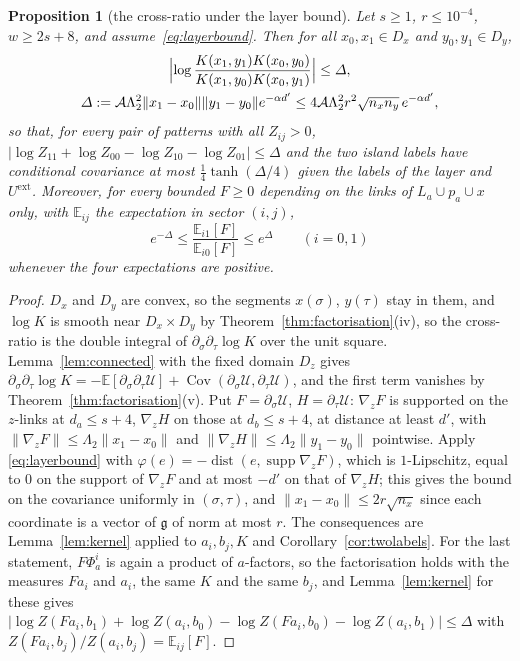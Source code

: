 \documentclass[11pt]{amsart}
\newtheorem{proposition}[theorem]{Proposition}
\theoremstyle{definition}
\theoremstyle{remark}
\numberwithin{equation}{section}
\newcommand{\E}{\mathbb{E}}
\newcommand{\g}{\mathfrak{g}}
\newcommand{\Cov}{\operatorname{Cov}}
\newcommand{\dist}{\operatorname{dist}}
\begin{document}
\begin{proposition}[the cross-ratio under the layer bound]\label{prop:layercross}
Let $s\ge1$, $r\le10^{-4}$, $w\ge2s+8$, and assume~\eqref{eq:layerbound}.
Then for all $x_0,x_1\in D_x$ and $y_0,y_1\in D_y$,
\[
\begin{gathered}
\Bigl|\log\frac{K(x_1,y_1)K(x_0,y_0)}{K(x_1,y_0)K(x_0,y_1)}\Bigr|\le
\varDelta,\\
\varDelta:=\mathcal A\Lambda_2^2\lVert x_1-x_0\rVert\lVert y_1-y_0\rVert
e^{-\alpha d'}\le4\mathcal A\Lambda_2^2r^2\sqrt{n_xn_y}\,e^{-\alpha d'},
\end{gathered}
\]
so that, for every pair of patterns with all $Z_{ij}>0$,
$\lvert\log Z_{11}+\log Z_{00}-\log Z_{10}-\log Z_{01}\rvert\le\varDelta$
and the two island labels have conditional covariance at most
$\frac14\tanh(\varDelta/4)$ given the labels of the layer and
$U^{\mathrm{ext}}$. Moreover, for every bounded $F\ge0$ depending on the
links of $L_a\cup p_a\cup x$ only, with $\E_{ij}$ the expectation in
sector $(i,j)$,
\[
e^{-\varDelta}\le\frac{\E_{i1}[F]}{\E_{i0}[F]}\le e^{\varDelta}
\qquad(i=0,1)
\]
whenever the four expectations are positive.
\end{proposition}

\begin{proof}
$D_x$ and $D_y$ are convex, so the segments $x(\sigma)$, $y(\tau)$ stay in
them, and $\log K$ is smooth near $D_x\times D_y$ by
Theorem~\ref{thm:factorisation}(iv), so the cross-ratio is the double
integral of $\partial_\sigma\partial_\tau\log K$ over the unit square.
Lemma~\ref{lem:connected} with the fixed domain $D_z$ gives
$\partial_\sigma\partial_\tau\log K=-\E[\partial_\sigma\partial_\tau
\mathcal U]+\Cov(\partial_\sigma\mathcal U,\partial_\tau\mathcal U)$, and
the first term vanishes by Theorem~\ref{thm:factorisation}(v). Put
$F=\partial_\sigma\mathcal U$, $H=\partial_\tau\mathcal U$: $\nabla_zF$ is
supported on the $z$-links at $d_a\le s+4$, $\nabla_zH$ on those at
$d_b\le s+4$, at distance at least $d'$, with
$\lVert\nabla_zF\rVert\le\Lambda_2\lVert x_1-x_0\rVert$ and
$\lVert\nabla_zH\rVert\le\Lambda_2\lVert y_1-y_0\rVert$ pointwise. Apply
\eqref{eq:layerbound} with $\varphi(e)=-\dist(e,\operatorname{supp}
\nabla_zF)$, which is $1$-Lipschitz, equal to $0$ on the support of
$\nabla_zF$ and at most $-d'$ on that of $\nabla_zH$; this gives the bound
on the covariance uniformly in $(\sigma,\tau)$, and
$\lVert x_1-x_0\rVert\le2r\sqrt{n_x}$ since each coordinate is a vector of
$\g$ of norm at most $r$. The consequences are Lemma~\ref{lem:kernel}
applied to $a_i,b_j,K$ and Corollary~\ref{cor:twolabels}. For the last
statement, $F\Phi_a^i$ is again a product of $a$-factors, so the
factorisation holds with the measures $Fa_i$ and $a_i$, the same $K$ and
the same $b_j$, and Lemma~\ref{lem:kernel} for these gives
$\lvert\log Z(Fa_i,b_1)+\log Z(a_i,b_0)-\log Z(Fa_i,b_0)-\log Z(a_i,b_1)
\rvert\le\varDelta$ with $Z(Fa_i,b_j)/Z(a_i,b_j)=\E_{ij}[F]$.
\end{proof}
\end{document}
